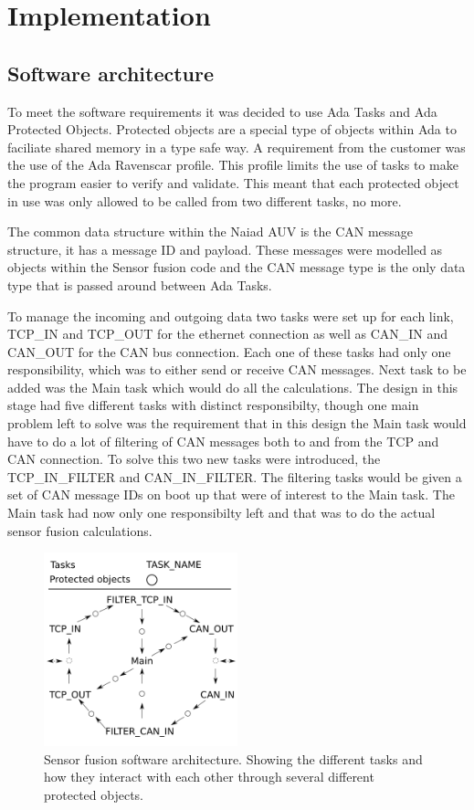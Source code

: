 \pagebreak
\section{Implementation}\label{sec:implementation}
\subsection{Software architecture}
To meet the software requirements it was decided to use Ada Tasks and Ada
Protected Objects. Protected objects are a special type of objects within Ada
to faciliate shared memory in a type safe way. A requirement from the
customer was the use of the Ada Ravenscar profile. This profile limits
the use of tasks to make the program easier to verify and validate. This meant
that each protected object in use was only allowed to be called from two
different tasks, no more.

The common data structure within the Naiad AUV is the CAN message structure,
it has a message ID and payload. These messages were modelled as objects within
the Sensor fusion code and the CAN message type is the only data type that
is passed around between Ada Tasks.

To manage the incoming and outgoing data two tasks were set up for each link,
TCP\_IN and TCP\_OUT for the ethernet connection as well as CAN\_IN and CAN\_OUT for
the CAN bus connection. Each one of these tasks had only one responsibility, which
was to either send or receive CAN messages. Next task to be added was the Main
task which would do all the calculations. The design in this stage had five
different tasks with distinct responsibilty, though one main problem left to solve
was the requirement that in this design the Main task would have to do a lot of
filtering of CAN messages both to and from the TCP and CAN connection. To solve this
two new tasks were introduced, the TCP\_IN\_FILTER and CAN\_IN\_FILTER. The filtering
tasks would be given a set of CAN message IDs on boot up that were of interest to
the Main task. The Main task had now only one responsibilty left and that was
to do the actual sensor fusion calculations.

\begin{figure}[ht]
    \includegraphics[width=0.5\textwidth]{./figure/software_architecture.png}
    \caption{Sensor fusion software architecture. Showing the different tasks and
    how they interact with each other through several different protected objects.}
    \label{fig:software_architecture}
\end{figure}

